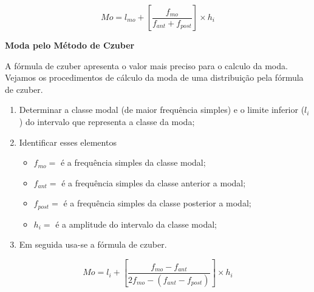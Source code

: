 \begin{equation}\label{}
    Mo=l_{mo}+\left[\frac{f_{mo}}{f_{ant}+f_{post}}\right]\times h_{i}
\end{equation}


\textbf{Moda pelo Método de Czuber}
\vskip0.3cm

A fórmula de czuber apresenta o valor mais preciso para o calculo da moda. Vejamos os procedimentos
de cálculo da moda de uma distribuição pela fórmula de czuber.


\begin{enumerate}
\item [{1°)}] Determinar a classe modal (de maior frequência simples) e o limite inferior ($l_{i}$) do intervalo que representa a classe da moda;
\item [{2°)}] Identificar esses elementos
\begin{itemize}
   \item $f_{mo}=$ é a frequência simples da classe modal;
   \item $f_{ant}=$ é a frequência simples da classe anterior a modal;
   \item $f_{post}=$ é a frequência simples da classe posterior a modal;
   \item $h_{i}=$ é a amplitude do intervalo da classe modal;
 \end{itemize}
\item [{4°)}] Em seguida usa-se a fórmula de czuber.
\end{enumerate}

\begin{equation}\label{}
    Mo=l_{i}+\left[\frac{f_{mo}-f_{ant}}{2f_{mo}-(f_{ant}-f_{post})}\right]\times h_{i}
\end{equation}








